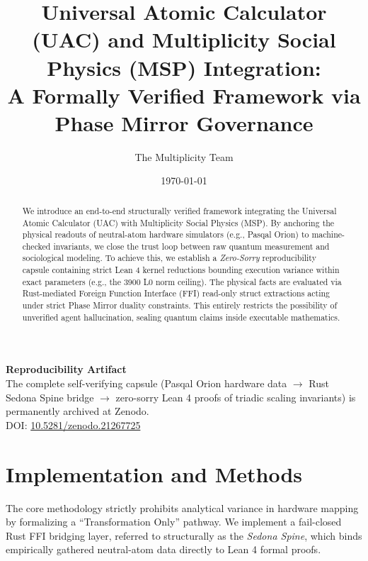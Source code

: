 \documentclass[aps,pra,preprint,superscriptaddress,11pt,floatfix]{revtex4-2}
\begin{document}
\title{Universal Atomic Calculator (UAC) and Multiplicity Social Physics (MSP) Integration:\\
A Formally Verified Framework via Phase Mirror Governance}

\author{The Multiplicity Team}
\date{\today}

\begin{abstract}
We introduce an end-to-end structurally verified framework integrating the Universal Atomic Calculator (UAC) with Multiplicity Social Physics (MSP). By anchoring the physical readouts of neutral-atom hardware simulators (e.g., Pasqal Orion) to machine-checked invariants, we close the trust loop between raw quantum measurement and sociological modeling. To achieve this, we establish a \emph{Zero-Sorry} reproducibility capsule containing strict Lean 4 kernel reductions bounding execution variance within exact parameters (e.g., the 3900 L0 norm ceiling). The physical facts are evaluated via Rust-mediated Foreign Function Interface (FFI) read-only struct extractions acting under strict Phase Mirror duality constraints. This entirely restricts the possibility of unverified agent hallucination, sealing quantum claims inside executable mathematics.
\end{abstract}

\maketitle

\vspace{0.6cm}
\begin{center}
\textbf{Reproducibility Artifact} \\
The complete self-verifying capsule (Pasqal Orion hardware data $\to$ Rust Sedona Spine bridge $\to$ zero-sorry Lean 4 proofs of triadic scaling invariants) is permanently archived at Zenodo. \\
\vspace{0.2cm}
DOI: \href{https://doi.org/10.5281/zenodo.21267725}{10.5281/zenodo.21267725}
\end{center}
\vspace{0.4cm}

\section{Implementation and Methods}
The core methodology strictly prohibits analytical variance in hardware mapping by formalizing a ``Transformation Only'' pathway. We implement a fail-closed Rust FFI bridging layer, referred to structurally as the \emph{Sedona Spine}, which binds empirically gathered neutral-atom data directly to Lean 4 formal proofs. 
\end{document}
